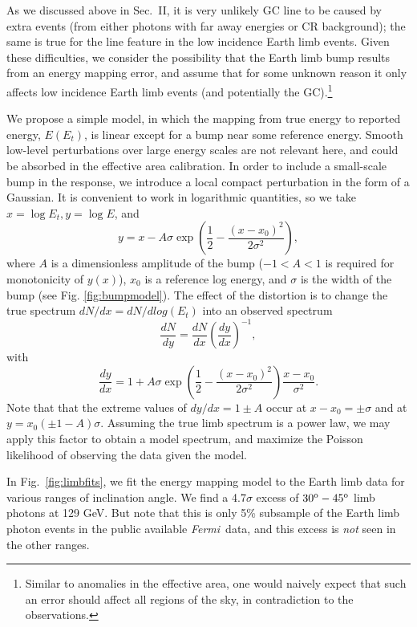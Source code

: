 \documentclass[aps,twocolumn,prd,superscriptaddress,showpacs,nofootinbib,fixfloat]{revtex4}
\newcommand{\be}{\begin{equation}}
\newcommand{\ee}{\end{equation}}
\newcommand{\Fermi}{{\slshape Fermi}}
\newcommand{\degree}{^{\rm o}}
\begin{document}
As we discussed above in Sec.~II, it is very unlikely %
GC line to be caused by extra events (from either photons with far away
energies or CR background); the same is true for the line feature in the low
incidence Earth limb events.  Given these difficulties, we consider the
possibility that the Earth limb bump results from an energy mapping error, and
assume that for some unknown reason it only affects low incidence Earth limb
events (and potentially the GC).\footnote{Similar to anomalies in the
effective area, one would naively expect that such an error should affect all
regions of the sky, in contradiction to the observations.}

We propose a simple model, in
which the mapping from true energy to reported energy,
$E(E_t)$, is linear except for a bump near some reference
energy.  Smooth low-level perturbations over large energy
scales are not relevant here, and could be absorbed in the
effective area calibration.  In order to include a
small-scale bump in the response, we introduce a local
compact perturbation in the form of a Gaussian.  It is
convenient to work in logarithmic quantities, so we take
$x=\log E_t, y=\log E$, and \be
\label{eq:yofx}
y=x - A\sigma \exp\left(\frac{1}{2}-\frac{(x-x_0)^2}{2\sigma^2}\right),
\ee
where $A$ is a dimensionless amplitude of the bump ($-1<A<1$
is required for monotonicity of $y(x)$), $x_0$ is a
reference log energy, and $\sigma$ is the width of the bump (see
Fig. \ref{fig:bumpmodel}).  The effect of the distortion is
to change the true spectrum $dN/dx = dN/dlog(E_t)$ into an
observed spectrum
\be
\label{eq:dndy}
\frac{dN}{dy} = \frac{dN}{dx} \left(\frac{dy}{dx}\right)^{-1} ,
\ee
with
\be
\label{eq:dydx}
\frac{dy}{dx} = 1 + A\sigma \exp\left(\frac{1}{2}-\frac{(x-x_0)^2}{2\sigma^2}\right)
\frac{x-x_0}{\sigma^2}.
\ee
Note that that the extreme values of $dy/dx = 1 \pm A$ occur
at $x-x_0 = \pm \sigma$ and at $y=x_0(\pm1-A)\sigma$.
Assuming the true limb spectrum is a power law, we may apply
this factor to obtain a model spectrum, and maximize the
Poisson likelihood of observing the data given the model.


In Fig.~\ref{fig:limbfits}, we fit the energy mapping model
to the Earth limb data for various ranges of inclination
angle. We find a 4.7$\sigma$ excess of $30\degree-45\degree$
limb photons at 129 GeV. But note that this is only 5\% subsample of the Earth
limb photon events in the public available \Fermi\ data, and this excess is
\emph{not} seen in the other ranges. 
\end{document}
